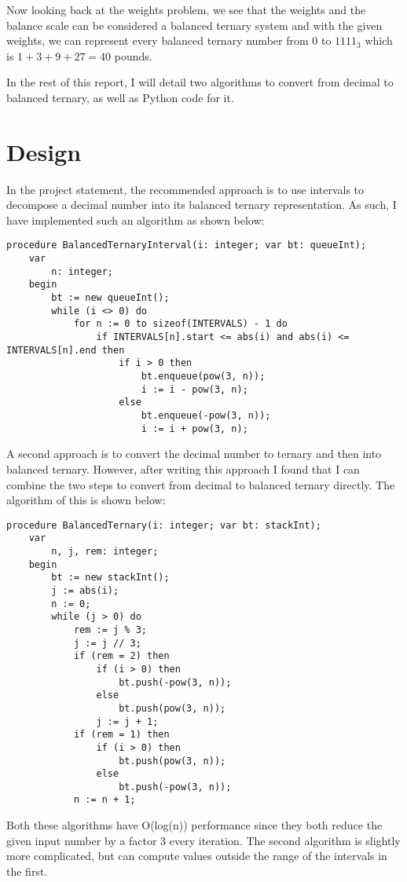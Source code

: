 \documentclass[12pt]{report}
\begin{document}
Now looking back at the weights problem, we see that the weights and the balance scale can be considered a balanced ternary system and with the given weights, we can represent every balanced ternary number from 0 to $1111_3$ which is $1+3+9+27 = 40$ pounds.

In the rest of this report, I will detail two algorithms to convert from decimal to balanced ternary, as well as Python code for it.

\chapter{Design}
In the project statement, the recommended approach is to use intervals to decompose a decimal number into its balanced ternary representation.
As such, I have implemented such an algorithm as shown below:
\begin{verbatim}
procedure BalancedTernaryInterval(i: integer; var bt: queueInt);
    var
        n: integer;
    begin
        bt := new queueInt();
        while (i <> 0) do
            for n := 0 to sizeof(INTERVALS) - 1 do
                if INTERVALS[n].start <= abs(i) and abs(i) <= INTERVALS[n].end then
                    if i > 0 then
                        bt.enqueue(pow(3, n));
                        i := i - pow(3, n);
                    else
                        bt.enqueue(-pow(3, n));
                        i := i + pow(3, n);
\end{verbatim}
\pagebreak

A second approach is to convert the decimal number to ternary and then into balanced ternary.
However, after writing this approach I found that I can combine the two steps to convert from decimal to balanced ternary directly.
The algorithm of this is shown below:
\begin{verbatim}
procedure BalancedTernary(i: integer; var bt: stackInt);
    var
        n, j, rem: integer;
    begin
        bt := new stackInt();
        j := abs(i);
        n := 0;
        while (j > 0) do
            rem := j % 3;
            j := j // 3;
            if (rem = 2) then
                if (i > 0) then
                    bt.push(-pow(3, n));
                else
                    bt.push(pow(3, n));
                j := j + 1;
            if (rem = 1) then
                if (i > 0) then
                    bt.push(pow(3, n));
                else
                    bt.push(-pow(3, n));
            n := n + 1;
\end{verbatim}

Both these algorithms have O(log(n)) performance since they both reduce the given input number by a factor 3 every iteration.
The second algorithm is slightly more complicated, but can compute values outside the range of the intervals in the first. 
\end{document}
